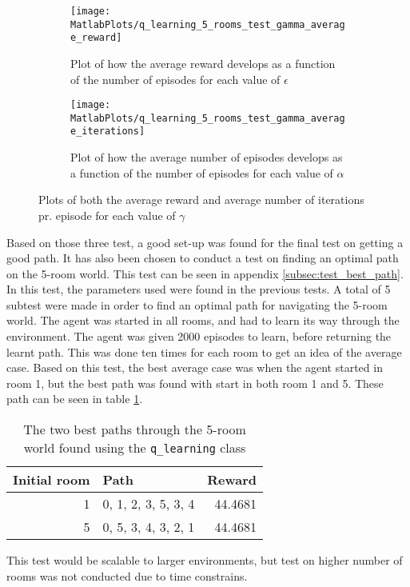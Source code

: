 \documentclass[../Head/Main.tex]{subfiles}
\begin{document}
\begin{figure}[H]
	\centering
	\begin{subfigure}[b]{0.49\textwidth}
		\centering
		\texttt{[image: MatlabPlots/q\_learning\_5\_rooms\_test\_gamma\_average\_reward]}
		\caption{Plot of how the average reward develops as a function of the number of episodes for each value of $\epsilon$}
		\label{fig:q-learn_gamma_reward_impl}
	\end{subfigure}
	\hfill
	\begin{subfigure}[b]{0.49\textwidth}
		\centering
		\texttt{[image: MatlabPlots/q\_learning\_5\_rooms\_test\_gamma\_average\_iterations]}
		\caption{Plot of how the average number of episodes develops as a function of the number of episodes for each value of $\alpha$}
		\label{fig:q-learn_gamma_iterations_impl}
	\end{subfigure}
	\caption{Plots of both the average reward and average number of iterations pr. episode for each value of $\gamma$}
	\label{fig:q-learn_gamma_impl}
\end{figure}
Based on those three test, a good set-up was found for the final test on getting a good path. It has also been chosen to conduct a test on finding an optimal path on the 5-room world. This test can be seen in appendix \ref{subsec:test_best_path}. In this test, the parameters used were found in the previous tests. A total of 5 subtest were made in order to find an optimal path for navigating the 5-room world. The agent was started in all rooms, and had to learn its way through the environment. The agent was given 2000 episodes to learn, before returning the learnt path. This was done ten times for each room to get an idea of the average case. Based on this test, the best average case was when the agent started in room 1, but the best path was found with start in both room 1 and 5. These path can be seen in table \ref{tab:q_learn_result}.

\begin{table}[H]
	\centering
	\begin{tabular}{r l r}
	\hline
	\multicolumn{1}{l}{\textbf{Initial room}} & \textbf{Path} & \textbf{Reward} \\ 			\hline
	1  & 0, 1, 2, 3, 5, 3, 4  & 44.4681\\
	5  & 0, 5, 3, 4, 3, 2, 1  & 44.4681\\
	\hline
	\end{tabular}
	\caption{The two best paths through the 5-room world found using the \texttt{q\_learning} class}
	\label{tab:q_learn_result}
\end{table}
This test would be scalable to larger environments, but test on higher number of rooms was not conducted due to time constrains.
\end{document}
